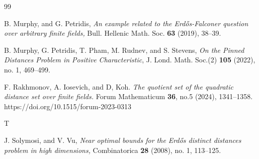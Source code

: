 \documentclass[a4paper,11pt]{amsart}
\numberwithin{equation}{section}
\begin{document}
\begin{thebibliography}{99}

 B. Murphy, and G. Petridis, \textit{An example related to the Erd\H{o}s-Falconer question over arbitrary finite fields,} Bull. Hellenic Math. Soc. \textbf{63} (2019), 38--39.




 B. Murphy, G. Petridis, T. Pham, M. Rudnev, and S. Stevens, \textit{On the Pinned Distances Problem in Positive Characteristic}, J. Lond. Math. Soc.(2) \textbf{105} (2022), no. 1, 469--499.

F. Rakhmonov, A. Iosevich, and D, Koh. \textit{The quotient set of the quadratic distance set over finite fields.}
Forum Mathematicum \textbf{36}, no.5 (2024), 1341--1358.
https://doi.org/10.1515/forum-2023-0313




T






 J. Solymosi, and V. Vu, \textit{Near optimal bounds for the Erd\H{o}s distinct distances problem in high dimensions,} Combinatorica \textbf{28} (2008), no. 1, 113--125.



\end{thebibliography}
\end{document}

